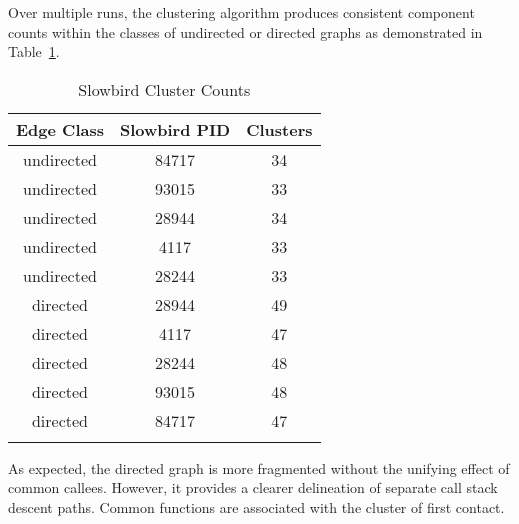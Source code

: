 \documentclass{article}[letter,10pt]
\begin{document}
{{{      Over multiple runs, the clustering algorithm produces consistent component counts within the classes of undirected
      or directed graphs as demonstrated in Table~\ref{tbl:slowbirdclcts}.
      {\footnotesize
      \begin{longtable}{c c c}
        Edge Class & Slowbird PID & Clusters \\
        \endhead
        \hline
        undirected & 84717  & 34 \\
        undirected & 93015  & 33 \\
        undirected & 28944  & 34 \\
        undirected & 4117  & 33 \\
        undirected & 28244  & 33 \\
        \hline
        directed & 28944  & 49 \\
        directed & 4117  & 47 \\
        directed & 28244  & 48 \\
        directed & 93015  & 48 \\
        directed & 84717  & 47 \\
        \hline
        \caption{Slowbird Cluster Counts}
        \label{tbl:slowbirdclcts}
      \end{longtable}}
      As expected, the directed graph is more fragmented without the unifying effect of common callees. However, it provides
      a clearer delineation of separate call stack descent paths. Common functions are associated with the cluster of first contact.

}}}
\end{document}
